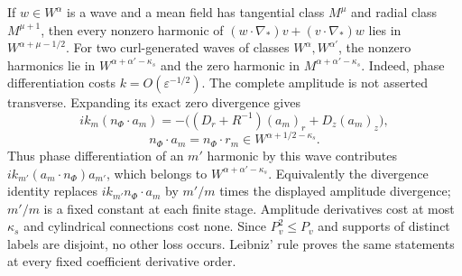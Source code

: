 \documentclass[10pt,a4paper]{article}
\begin{document}
If $w\in W^\alpha$ is a wave and a mean field has tangential class
$M^\mu$ and radial class $M^{\mu+1}$, then every nonzero harmonic of
$(w\!\cdot\!\nabla_*)v+(v\!\cdot\!\nabla_*)w$ lies in
$W^{\alpha+\mu-1/2}$.  For two curl-generated waves of classes
$W^\alpha,W^{\alpha'}$, the nonzero harmonics lie in
$W^{\alpha+\alpha'-\kappa_s}$ and the zero harmonic in
$M^{\alpha+\alpha'-\kappa_s}$.  Indeed, phase differentiation costs
$k=O(\varepsilon^{-1/2})$. The complete amplitude is not asserted
transverse. Expanding its exact zero divergence gives
\[
ik_m(n_\Phi\cdot a_m)
=-\big((D_r+R^{-1})(a_m)_r+D_z(a_m)_z\big),
\]
\[
n_\Phi\cdot a_m=n_\Phi\cdot r_m\in
W^{\alpha+1/2-\kappa_s}.
\]
Thus phase differentiation of an $m'$ harmonic by this wave contributes
$ik_{m'}(a_m\cdot n_\Phi)a_{m'}$, which belongs to
$W^{\alpha+\alpha'-\kappa_s}$. Equivalently the divergence identity
replaces $ik_{m'}n_\Phi\cdot a_m$ by $m'/m$ times the displayed amplitude
divergence; $m'/m$ is a fixed constant at each finite stage. Amplitude
derivatives cost at most $\kappa_s$ and cylindrical connections cost none.
Since $P_v^2\le P_v$ and supports of distinct labels
are disjoint, no other loss occurs.  Leibniz' rule proves the same statements
at every fixed coefficient derivative order.
\end{document}
